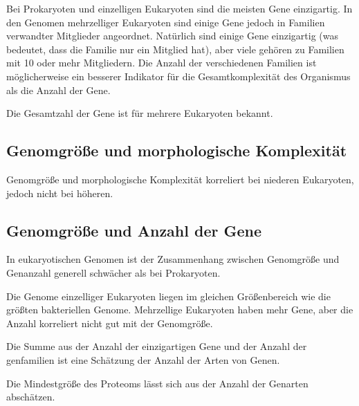 Bei Prokaryoten und einzelligen Eukaryoten sind die meisten Gene
einzigartig.
In den Genomen mehrzelliger Eukaryoten sind einige
Gene jedoch in Familien verwandter Mitglieder angeordnet.
Natürlich
sind einige Gene einzigartig (was bedeutet, dass die Familie nur ein
Mitglied hat), aber viele gehören zu Familien mit 10 oder mehr Mitgliedern.
Die Anzahl der verschiedenen Familien ist möglicherweise ein besserer Indikator für die
Gesamtkomplexität des Organismus als die Anzahl der Gene.

Die Gesamtzahl der Gene ist für
mehrere Eukaryoten bekannt.


\subsection{Genomgröße und morphologische Komplexität}\label{subsec:genomgroe-und-morphologische-komplexitat}

Genomgröße und morphologische Komplexität korreliert bei niederen Eukaryoten, jedoch nicht bei höheren.

\subsection{Genomgröße und Anzahl der Gene}\label{subsec:genomgroe-und-anzahl-der-gene}
In eukaryotischen Genomen ist der Zusammenhang zwischen
Genomgröße und Genanzahl generell schwächer als bei Prokaryoten.

Die Genome einzelliger Eukaryoten liegen im gleichen Größenbereich
wie die größten bakteriellen Genome.
Mehrzellige Eukaryoten haben mehr Gene, aber die Anzahl korreliert nicht gut mit der Genomgröße.


Die Summe aus der Anzahl der einzigartigen Gene und der Anzahl
der \gls{genfamilie}n ist eine Schätzung der Anzahl der Arten von Genen.


Die Mindestgröße des Proteoms lässt sich
aus der Anzahl der Genarten abschätzen.




